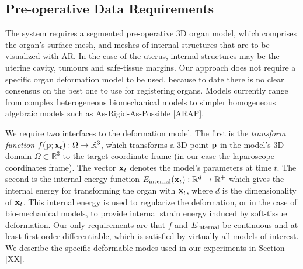 \subsection{Pre-operative Data Requirements}
\label{sec:inputModels}
The system requires a segmented pre-operative 3D organ model, which comprises the organ's surface mesh, and meshes of internal structures that are to be visualized with AR.
In the case of the uterus, internal structures may be the uterine cavity, tumours and safe-tissue margins. %
Our approach does not require a specific organ deformation model to be used, because to date there is no clear consensus on the best one to use for registering organs. Models currently range from complex heterogeneous biomechanical models to simpler homogeneous algebraic models such as As-Rigid-As-Possible [ARAP]. 

We require two interfaces to the deformation model. The first is the \emph{transform function} $f(\mathbf{p};\mathbf{x}_t): \Omega\rightarrow \mathbb{R}^3$, which transforms a 3D point $\mathbf{p}$ in the model's 3D domain $\Omega\subset \mathbb{R}^3$ to the target coordinate frame (in our case the laparoscope coordinates frame). The vector $\mathbf{x}_t$ denotes the model's parameters at time $t$. %
The second is the internal energy function $E_{\text{internal}}(\mathbf{x}_{t}):\mathbb{R}^{d}\rightarrow\mathbb{R}^{+}$ which gives the internal energy for transforming the organ with $\mathbf{x}_t$, where $d$ is the dimensionality of $\mathbf{x}_{t}$. This internal energy is used to regularize the deformation, or in the case of bio-mechanical models, to provide internal strain energy induced by soft-tissue deformation.
Our only requirements are that $f$ and $E_{\text{internal}}$ be continuous and at least first-order differentiable, which is satisfied by virtually all models of interest. We describe the specific deformable modes used in our experiments in Section \ref{XX}.
 
